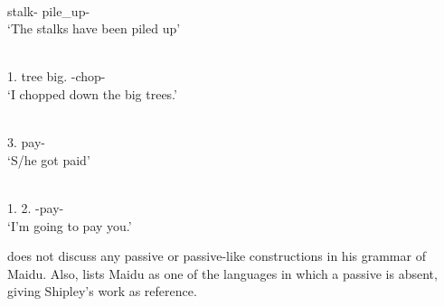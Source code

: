 \begin{exe}\ex\label{WapPass1}
\begin{xlist}
\ex\gll{} \\
stalk-\nom{} pile\_up-\pass{}\\
\glt `The stalks have been piled up'

\ex\gll \textbf{}   \\
1\sg{}.\nom{} tree big.\pl{} \dir{}-chop-\pst{}\\
\glt `I chopped down the big trees.'
\end{xlist}
\end{exe}

\begin{exe}\ex\label{WapPass2}
\begin{xlist}
\ex\gll{} \\
3\sg{}.\nom{} pay-\pass{}\\
\glt `S/he got paid'

\ex\gll \textbf{}  \\
1\sg{}.\nom{} 2\sg{}.\acc{} \uop{}-pay-\fut{}\\
\glt `I'm going to pay you.' %
\end{xlist}
\end{exe}




\citet{Shipley:1964} does not discuss any passive or passive-like constructions in his grammar of Maidu. 
Also, \citet{WALS107} lists Maidu as one of the languages in which a passive is absent, giving Shipley's work as reference. 

